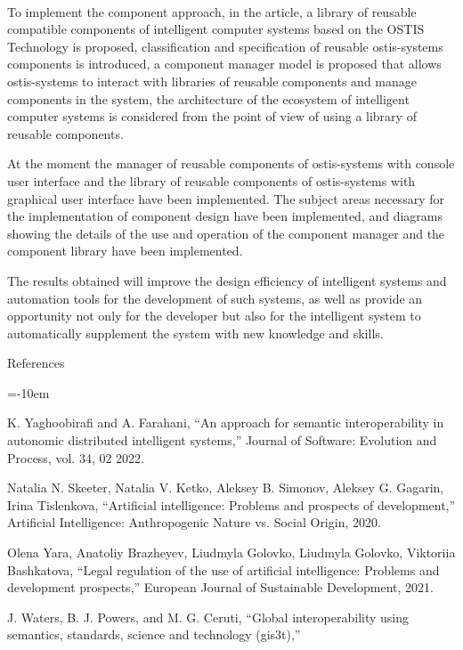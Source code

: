 \documentclass{article}
\begin{document}
\begin{multicols}{2}
\begin{itemize}
\newpage
\\
To implement the component approach, in the article, a
library of reusable compatible components of intelligent
computer systems based on the OSTIS Technology is
proposed, classification and specification of reusable
ostis-systems components is introduced, a component
manager model is proposed that allows ostis-systems
to interact with libraries of reusable components and
manage components in the system, the architecture of the
ecosystem of intelligent computer systems is considered
from the point of view of using a library of reusable
components. \par
At the moment the manager of reusable components of
ostis-systems with console user interface and the library
of reusable components of ostis-systems with graphical
user interface have been implemented. The subject areas
necessary for the implementation of component design
have been implemented, and diagrams showing the details of the use and operation of the component manager
and the component library have been implemented. \par
The results obtained will improve the design efficiency of intelligent systems and automation tools for
the development of such systems, as well as provide an
opportunity not only for the developer but also for the
intelligent system to automatically supplement the system
with new knowledge and skills.
\begin{center}
    References
\end{center}
\begin{enumerate}[label=\textit{[\arabic*]}]
\scriptsize
\leftskip=-10em
 \item K. Yaghoobirafi and A. Farahani, “An approach for semantic interoperability in autonomic distributed intelligent systems,” Journal
of Software: Evolution and Process, vol. 34, 02 2022.
 \item Natalia N. Skeeter, Natalia V. Ketko, Aleksey B. Simonov,
Aleksey G. Gagarin, Irina Tislenkova, “Artificial intelligence:
Problems and prospects of development,” Artificial Intelligence:
Anthropogenic Nature vs. Social Origin, 2020.
 \item Olena Yara, Anatoliy Brazheyev, Liudmyla Golovko, Liudmyla
Golovko, Viktoriia Bashkatova, “Legal regulation of the use
of artificial intelligence: Problems and development prospects,”
European Journal of Sustainable Development, 2021.
 \item J. Waters, B. J. Powers, and M. G. Ceruti, “Global interoperability using semantics, standards, science and technology (gis3t),”

\end{enumerate}
\end{itemize}
\end{multicols}
\end{document}
